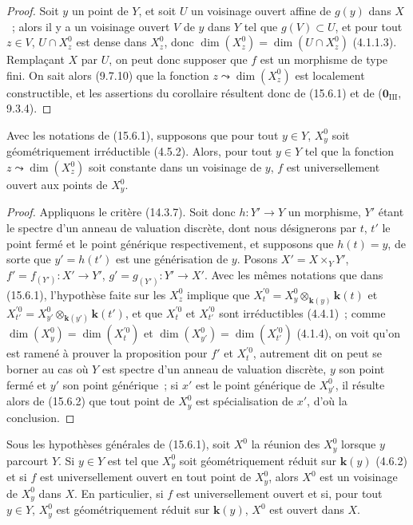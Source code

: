 \begin{proof}
Soit $y$ un point de $Y$, et soit $U$ un voisinage ouvert affine de $g(y)$ dans $X$~; alors il y a un voisinage ouvert $V$ de $y$ dans $Y$ tel que $g(V)\subset U$, et pour tout $z\in V$, $U\cap X_z^0$ est dense dans $X_z^0$, donc $\dim(X_z^0)=\dim(U\cap X_z^0)$ (4.1.1.3). Remplaçant $X$ par $U$, on peut donc supposer que $f$ est un morphisme de type fini. On sait alors (9.7.10) que la fonction $z\leadsto\dim(X_z^0)$ est localement constructible, et les assertions du corollaire résultent donc de (15.6.1) et de ($\mathbf{0}_{\mathrm{III}}$, 9.3.4).
\end{proof}

\begin{proposition}[15.6.3]
\label{IV.15.6.3-fr}
Avec les notations de \textup{(15.6.1)}, supposons que pour tout $y\in Y$, $X_y^0$ soit géométriquement irréductible \textup{(4.5.2)}. Alors, pour tout $y\in Y$ tel que la fonction $z\leadsto\dim(X_z^0)$ soit constante dans un voisinage de $y$, $f$ est universellement ouvert aux points de $X_y^0$.
\end{proposition}

\begin{proof}
Appliquons le critère (14.3.7). Soit donc $h:Y'\to Y$ un morphisme, $Y'$ étant le spectre d'un anneau de valuation discrète, dont nous désignerons par $t$, $t'$ le point fermé et le point générique respectivement, et supposons que $h(t)=y$, de sorte que $y'=h(t')$ est une générisation de $y$. Posons $X'=X\times_Y Y'$, $f'=f_{(Y')}:X'\to Y'$, $g'=g_{(Y')}:Y'\to X'$. Avec les mêmes notations que dans (15.6.1), l'hypothèse faite sur les $X_z^0$ implique que
$X_t^{\prime 0}=X_y^0\otimes_{\mathbf{k}(y)}\boldsymbol{k}(t)$ et
$X_{t'}^{\prime 0}=X_{y'}^0\otimes_{\mathbf{k}(y')}\boldsymbol{k}(t')$,
et que $X_t^{\prime 0}$ et $X_{t'}^{\prime 0}$ sont irréductibles (4.4.1)~; comme $\dim(X_y^0)=\dim(X_t^{\prime 0})$ et $\dim(X_{y'}^0)=\dim(X_{t'}^{\prime 0})$ (4.1.4), on voit qu'on est ramené à prouver la proposition pour $f'$ et $X_t^{\prime 0}$, autrement dit on peut se borner au cas où $Y$ est spectre d'un anneau de valuation discrète, $y$ son point fermé et $y'$ son point générique~; si $x'$ est le point générique de $X_{y'}^0$, il résulte alors de (15.6.2) que tout point de $X_y^0$ est spécialisation de $x'$, d'où la conclusion.
\end{proof}

\begin{proposition}[15.6.4]
\label{IV.15.6.4-fr}
Sous les hypothèses générales de \textup{(15.6.1)}, soit $X^0$ la réunion des $X_y^0$ lorsque $y$ parcourt $Y$. Si $y\in Y$ est tel que $X_y^0$ soit géométriquement réduit sur $\boldsymbol{k}(y)$ \textup{(4.6.2)} et si $f$ est universellement ouvert en tout point de $X_y^0$, alors $X^0$ est un voisinage de $X_y^0$ dans $X$. En particulier, si $f$ est universellement ouvert et si, pour tout $y\in Y$, $X_y^0$ est géométriquement réduit sur $\boldsymbol{k}(y)$, $X^0$ est ouvert dans $X$.
\end{proposition}

